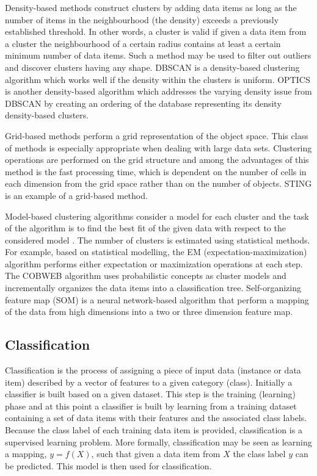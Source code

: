 Density-based methods construct clusters by adding data items as long as the number of items in the neighbourhood (the density) exceeds a previously established threshold. In other words, a cluster is valid if given a data item from a cluster the neighbourhood of a certain radius contains at least a certain minimum number of data items. Such a method may be used to filter out outliers and discover clusters having any shape. DBSCAN \cite{Ester09Density} is a density-based clustering algorithm which works well if the density within the clusters is uniform. OPTICS \cite{Ankerst99OPTICS} is another density-based algorithm which addresses the varying density issue from DBSCAN by creating an ordering of the database representing its density density-based clusters.

Grid-based methods perform a grid representation of the object space. This class of methods is especially appropriate when dealing with large data sets. Clustering operations are performed on the grid structure and among the advantages of this method is the fast processing time, which is  dependent on the number of cells in each dimension from the grid space rather than on the number of objects. STING \cite{Wang97STING} is an example of a grid-based method. 

Model-based clustering algorithms consider a model for each cluster and the task of the algorithm is to find the best fit of the given  data with respect to the considered model \cite{Han01Spatial}. The number of clusters is estimated using statistical methods. For example, based on statistical modelling, the EM (expectation-maximization) algorithm performs either expectation or maximization operations at each step. The COBWEB algorithm uses probabilistic concepts as cluster models and incrementally organizes the data items into a classification tree. Self-organizing feature map (SOM) is a neural network-based algorithm that perform a mapping of the data  from high dimensions into a two or three dimension feature map. 


\subsection{Classification}

Classification is the process of assigning a piece of input data (instance or data item) described by a vector of features to a given category (class). Initially a classifier is built based on a given dataset. This step is the training (learning) phase and at this point a classifier is built by learning from a training dataset containing a set of data items with their features and the associated class labels.
Because the class label of each training data item is provided, classification is a supervised learning problem. 
More formally, classification may be seen as learning a mapping, $y = f(X)$, such that given a data item from $X$ the class label $y$ can be predicted. This model is then used for classification. 

